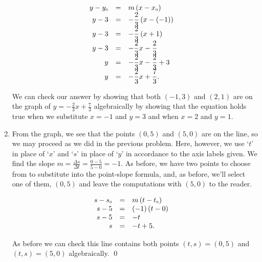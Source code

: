 \begin{ex}
\begin{enumerate}
\vspace{-.1in}

\setlength{\extrarowheight}{10pt}
\[\begin{array}{rclr} 
y - y_{\mbox{\tiny$0$}} & = & m\left(x - x_{\mbox{\tiny$0$}}\right)  & \\
y - 3 & = & -\dfrac{2}{3} \left(x - (-1)\right) & \\
y - 3 & = & -\dfrac{2}{3} \left(x +1 \right) & \\
y - 3& = & -\dfrac{2}{3}x - \dfrac{2}{3}\\
y& = & -\dfrac{2}{3}x - \dfrac{2}{3} + 3\\
y & = & -\dfrac{2}{3} x + \dfrac{7}{3}. \\ 
\end{array} \]

\setlength{\extrarowheight}{2pt}

We can check our answer by showing that both $(-1,3)$ and $(2,1)$ are on the graph of $y  =  -\frac{2}{3} x + \frac{7}{3}$ algebraically by showing that the equation holds true when we substitute $x = -1$ and $y=3$ and when $x = 2$ and $y = 1$.

\item  From the graph, we see that the points $(0,5)$ and $(5,0)$ are on the line, so we may proceed as we did in the previous problem.  Here, however,  we use `$t$' in place of `$x$' and `$s$' in place of `$y$' in accordance to the axis labels given.  We find the slope $m = \frac{\Delta s}{\Delta t} = \frac{0 - 5}{5 - 0} = -1$.  As before, we have two points to choose from to substitute into the point-slope formula, and, as before, we'll select one of them, $(0,5)$ and leave the computations with $(5,0)$ to the reader.  

\[\begin{array}{rclr} 
s - s_{\mbox{\tiny$0$}} & = & m\left(t - t_{\mbox{\tiny$0$}}\right)  & \\
s - 5 & = & (-1) \left(t -0 \right) & \\
s- 5 & = &-t & \\
s& = & -t + 5.\\
\end{array} \]

\enlargethispage{.1in}

As before we can check this line contains both points $(t,s) = (0,5)$ and $(t,s) = (5,0)$ algebraically.  \qed

\end{enumerate}

\end{ex}

